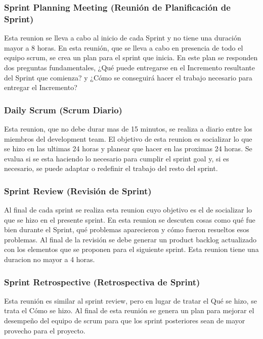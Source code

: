 \subsubsection{Sprint Planning Meeting (Reunión de Planificación de Sprint)}

Esta reunion se lleva a cabo al inicio de cada Sprint y no tiene una duración mayor a 8 horas. En esta reunión, que se lleva a cabo en presencia de todo el equipo scrum, se crea un plan para el sprint que inicia. En este plan se responden dos preguntas fundamentales, ¿Qué puede entregarse en el Incremento resultante del Sprint que comienza? y ¿Cómo se conseguirá hacer el trabajo necesario para entregar el Incremento?

\subsubsection{Daily Scrum (Scrum Diario)}

Esta reunion, que no debe durar mas de 15 minutos, se realiza a diario entre los miembros del development team. El objetivo de esta reunion es socializar lo que se hizo en las ultimas 24 horas y planear que hacer en las proximas 24 horas. Se evalua si se esta haciendo lo necesario para cumplir el sprint goal y, si es necesario, se puede adaptar o redefinir el trabajo del resto del sprint.

\subsubsection{Sprint Review (Revisión de Sprint)}

Al final de cada sprint se realiza esta reunion cuyo objetivo es el de socializar lo que se hizo en el presente sprint. En esta reunion se descuten cosas como qué fue bien durante el Sprint, qué problemas aparecieron y cómo fueron resueltos esos problemas. Al final de la revisión se debe generar un product backlog actualizado con los elementos que se proponen para el siguiente sprint. Esta reunion tiene una duracion no mayor a 4 horas.

\subsubsection{Sprint Retrospective (Retrospectiva de Sprint)}

Esta reunión es similar al sprint review, pero en lugar de tratar el Qué se hizo, se trata el Cómo se hizo. Al final de esta reunión se genera un plan para mejorar el desempeño del equipo de scrum para que los sprint posteriores sean de mayor provecho para el proyecto.

